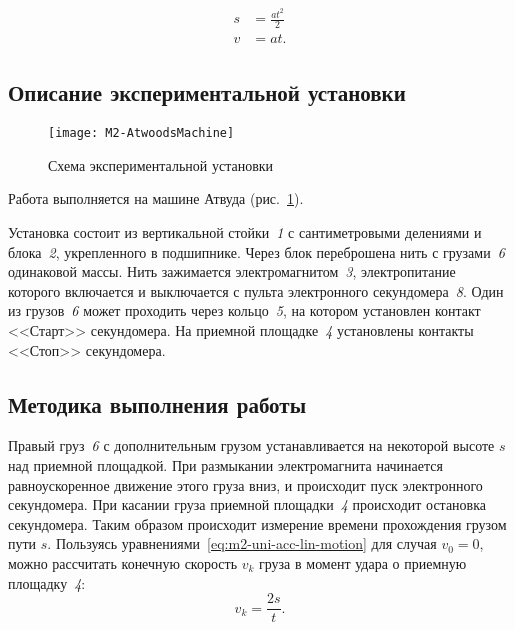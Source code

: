 \documentclass[a4paper, 12pt]{extarticle}
\begin{document}
\begin{align}
\label{eq:m2-uni-acc-lin-motion}
\begin{split}
s &= \frac{at^2}{2} \\ %
v &= at.
\end{split}
\end{align}

\subsection{Описание экспериментальной установки}
\begin{figure}[h] %
\begin{center}
\texttt{[image: M2-AtwoodsMachine]}
\end{center}
\caption{Схема экспериментальной установки \label{fig:m2-atwood-machine}}
\end{figure}
Работа выполняется на машине Атвуда (рис.~\ref{fig:m2-atwood-machine}).

Установка состоит из вертикальной стойки~\emph{1} с сантиметровыми делениями и блока~\emph{2}, укрепленного в подшипнике. Через блок переброшена нить с грузами~\emph{6} одинаковой массы. Нить зажимается электромагнитом~\emph{3}, электропитание которого включается и выключается с пульта электронного секундомера~\emph{8}. Один из грузов~\emph{6} может проходить через кольцо~\emph{5}, на котором установлен контакт <<Старт>> секундомера. На приемной площадке~\emph{4} установлены контакты <<Стоп>> секундомера.

\subsection{Методика выполнения работы}
Правый груз~\emph{6} с дополнительным грузом устанавливается на некоторой высоте $s$ над приемной площадкой. При размыкании электромагнита начинается равноускоренное движение этого груза вниз, и происходит пуск электронного секундомера. При касании груза приемной площадки~\emph{4} происходит остановка секундомера. Таким образом происходит измерение времени прохождения грузом пути $s$. Пользуясь уравнениями~\eqref{eq:m2-uni-acc-lin-motion} для случая $v_0 = 0$, можно рассчитать конечную скорость $v_k$ груза в момент удара о приемную площадку~\emph{4}:
\begin{equation}
\label{eq:m2-final-speed}
v_k = \frac{2s}{t}.
\end{equation}
\end{document}
